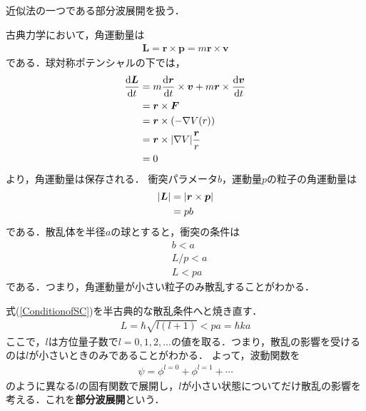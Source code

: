 \documentclass{report}
\begin{document}
  近似法の一つである部分波展開を扱う．


  古典力学において，角運動量は
  \begin{align}
    \bm{L} = \bm{r} \times \bm{p} = m\bm{r} \times \bm{v}
  \end{align}
  である．球対称ポテンシャルの下では，
  \begin{align}
    \dv{\bm{L}}{t} &= m\dv{\bm{r}}{t} \times \bm{v} + m\bm{r} \times \dv{\bm{v}}{t}\\
    &= \bm{r} \times \bm{F}\\
    &= \bm{r} \times (-\nabla V(r))\\
    &= \bm{r} \times \abs{\nabla V}\frac{\bm{r}}{r}\\
    &= 0
  \end{align}
  より，角運動量は保存される．
  衝突パラメータ$b$，運動量$p$の粒子の角運動量は
  \begin{align}
    \abs{\bm{L}} &= \abs{\bm{r} \times \bm{p}}\\
    &= pb
  \end{align}
  である．散乱体を半径$a$の球とすると，衝突の条件は
  \begin{align}
    &b < a\\
    &L/p < a\\
    \label{ConditionofSC}
    &L < pa
  \end{align}
  である．つまり，角運動量が小さい粒子のみ散乱することがわかる．

  式(\ref{ConditionofSC})を半古典的な散乱条件へと焼き直す．
  \begin{align}
    L = \hbar \sqrt{l(l+1)} < pa = \hbar ka
  \end{align}
  ここで，$l$は方位量子数で$l=0,1,2,\dots$の値を取る．つまり，散乱の影響を受けるのは$l$が小さいときのみであることがわかる．
  よって，波動関数を
  \begin{align}
    \psi = \phi^{l=0} + \phi^{l=1}+\cdots
  \end{align}
  のように異なる$l$の固有関数で展開し，$l$が小さい状態についてだけ散乱の影響を考える．これを\textbf{部分波展開}という．
\end{document}

